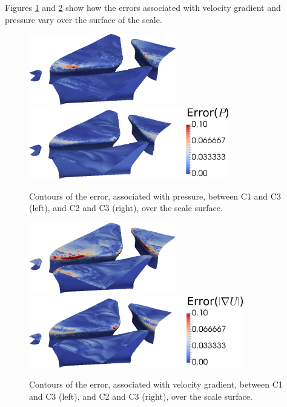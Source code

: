 \documentclass[12pt,oneside,a4paper]{article}
\begin{document}
Figures \ref{figure:rans:pressureError} and \ref{figure:rans:velocityGradientError} show how the errors associated with velocity gradient and pressure vary over the surface of the scale.
\begin{figure}
\centering
\includegraphics[height=3.1cm]{images/CFD_meshIndependence/tc3_p.png}\hfill \includegraphics[height=3.1cm]{images/CFD_meshIndependence/tc5_p_bar.png}
\caption{Contours of the error, associated with pressure, between C1 and C3 (left), and C2 and C3 (right), over the scale surface.}
\label{figure:rans:pressureError}
\end{figure}
\begin{figure}
\centering
\includegraphics[height=3.1cm]{images/CFD_meshIndependence/tc3_gradU.png}\hfill \includegraphics[height=3.1cm]{images/CFD_meshIndependence/tc5_gradU_bar.png}
\caption{Contours of the error, associated with velocity gradient, between C1 and C3 (left), and C2 and C3 (right), over the scale surface.}
\label{figure:rans:velocityGradientError}
\end{figure}
\end{document}
